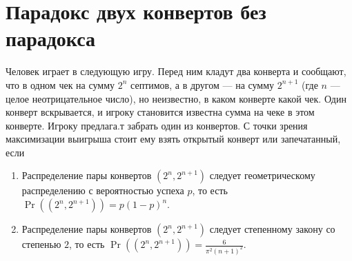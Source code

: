 \documentclass[12pt]{article}
\begin{document}
\section{Парадокс двух конвертов без парадокса}

Человек играет в следующую игру. Перед ним кладут два конверта и сообщают, что в одном чек на сумму $2^n$ септимов, а в другом --- на сумму $2^{n + 1}$ (где $n$ --- целое неотрицательное число), но неизвестно, в каком конверте какой чек. Один конверт вскрывается, и игроку становится известна сумма на чеке в этом конверте. Игроку предлага.т забрать один из конвертов. С точки зрения максимизации выигрыша стоит ему взять открытый конверт или запечатанный, если

\begin{enumerate}
    \item Распределение пары конвертов $(2^n, 2^{n + 1})$ следует геометрическому распределению с вероятностью успеха $p$, то есть $\Pr((2^n, 2^{n + 1})) = p(1 - p)^n$.
    \item Распределение пары конвертов $(2^n, 2^{n + 1})$ следует степенному закону со степенью $2$, то есть $\Pr((2^n, 2^{n + 1})) = \frac{6}{\pi^2 (n + 1)^2}$.
\end{enumerate}
\end{document}
